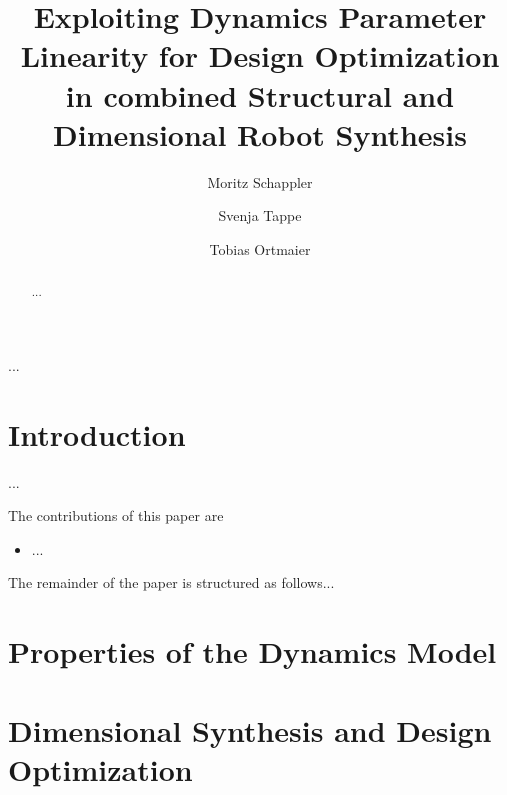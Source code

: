 \documentclass{svproc}
\begin{document}
    
\mainmatter              %
%
\title{Exploiting Dynamics Parameter Linearity for Design Optimization in combined Structural and Dimensional Robot Synthesis}
%
%
\author{Moritz Schappler \and Svenja Tappe \and Tobias Ortmaier}
%
%
%

\maketitle              %


\begin{abstract}
...
\end{abstract}

\begin{keywords}
...
\end{keywords}

\section{Introduction}
\label{sec:Intro}
...

The contributions of this paper are
\begin{itemize}
    \item ...
\end{itemize}

The remainder of the paper is structured as follows...

\section{Properties of the Dynamics Model}
\label{sec:DynMdl}

\section{Dimensional Synthesis and Design Optimization}
\label{sec:DimSynth}
\end{document}
